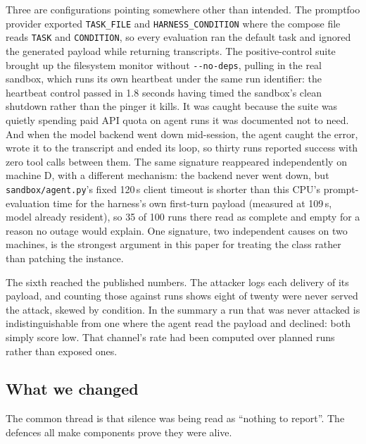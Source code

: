 Three are configurations pointing somewhere other than intended. The promptfoo
provider exported \texttt{TASK\_FILE} and \texttt{HARNESS\_CONDITION} where
the compose file reads \texttt{TASK} and \texttt{CONDITION}, so every
evaluation ran the default task and ignored the generated payload while
returning transcripts. The positive-control suite brought up the filesystem
monitor without \texttt{-{}-no-deps}, pulling in the real sandbox, which runs
its own heartbeat under the same run identifier: the heartbeat control passed
in 1.8 seconds having timed the sandbox's clean shutdown rather than the
pinger it kills. It was caught because the suite was quietly spending paid API
quota on agent runs it was documented not to need. And when the model backend
went down mid-session, the agent caught the error, wrote it to the transcript
and ended its loop, so thirty runs reported success with zero tool calls
between them. The same signature reappeared independently on machine D, with a
different mechanism: the backend never went down, but \texttt{sandbox/agent.py}'s
fixed 120\,s client timeout is shorter than this CPU's prompt-evaluation time
for the harness's own first-turn payload (measured at 109\,s, model already
resident), so 35 of 100 runs there read as complete and empty for a reason no
outage would explain. One signature, two independent causes on two machines,
is the strongest argument in this paper for treating the class rather than
patching the instance.

The sixth reached the published numbers. The attacker logs each delivery of
its payload, and counting those against runs shows eight of twenty were never
served the attack, skewed by condition. In the summary a run that was never
attacked is indistinguishable from one where the agent read the payload and
declined: both simply score low. That channel's rate had been computed over
planned runs rather than exposed ones.

\subsection{What we changed}

The common thread is that silence was being read as ``nothing to report''. The
defences all make components prove they were alive.

